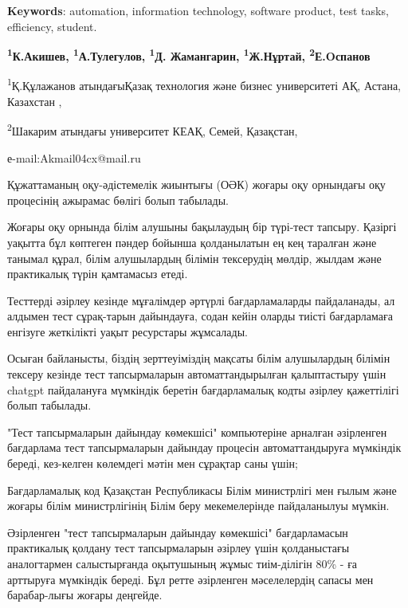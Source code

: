 {\bfseries Keywords}: automation, information technology, software
product, test tasks, efficiency, student.




\begin{center}
{\bfseries \textsuperscript{1}К.Акишев\envelope,
\textsuperscript{1}А.Тулегулов, \textsuperscript{1}Д. Жамангарин,
\textsuperscript{1}Ж.Нұртай, \textsuperscript{2}Е.Oспанов}

\textsuperscript{1}Қ.Құлажанов атындағыҚазақ технология және бизнес
университеті АҚ, Астана, Казахстан ,

\textsuperscript{2}Шакарим атындағы университет КЕАҚ, Семей, Қазақстан,

е-mail:Akmail04cx@mail.ru
\end{center}

Құжаттаманың оқу-әдістемелік жиынтығы (ОӘК) жоғары оқу орнындағы оқу
процесінің ажырамас бөлігі болып табылады.

Жоғары оқу орнында білім алушыны бақылаудың бір түрі-тест тапсыру.
Қазіргі уақытта бұл көптеген пәндер бойынша қолданылатын ең кең таралған
және танымал құрал, білім алушылардың білімін тексерудің мөлдір, жылдам
және практикалық түрін қамтамасыз етеді.

Тесттерді әзірлеу кезінде мұғалімдер әртүрлі бағдарламаларды
пайдаланады, ал алдымен тест сұрақ-тарын дайындауға, содан кейін оларды
тиісті бағдарламаға енгізуге жеткілікті уақыт ресурстары жұмсалады.

Осыған байланысты, біздің зерттеуіміздің мақсаты білім алушылардың
білімін тексеру кезінде тест тапсырмаларын автоматтандырылған
қалыптастыру үшін chatgpt пайдалануға мүмкіндік беретін бағдарламалық
кодты әзірлеу қажеттілігі болып табылады.

"Тест тапсырмаларын дайындау көмекшісі" компьютеріне арналған әзірленген
бағдарлама тест тапсырмаларын дайындау процесін автоматтандыруға
мүмкіндік береді, кез-келген көлемдегі мәтін мен сұрақтар саны үшін;

Бағдарламалық код Қазақстан Республикасы Білім министрлігі мен ғылым
және жоғары білім министрлігінің Білім беру мекемелерінде пайдаланылуы
мүмкін.

Әзірленген "тест тапсырмаларын дайындау көмекшісі" бағдарламасын
практикалық қолдану тест тапсырмаларын әзірлеу үшін қолданыстағы
аналогтармен салыстырғанда оқытушының жұмыс тиім-ділігін 80\% - ға
арттыруға мүмкіндік береді. Бұл ретте әзірленген мәселелердің сапасы мен
барабар-лығы жоғары деңгейде.

